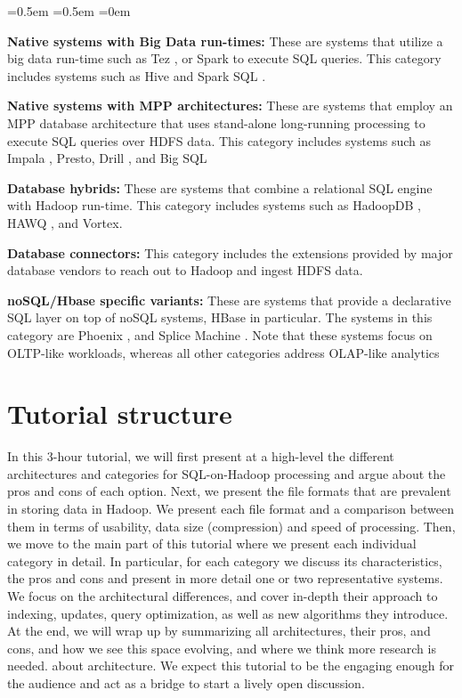 \documentclass{vldb}
\newcounter{mycounter}
\begin{document}
\vspace{-2mm}
\setcounter{mycounter}{0}
\begin{list}{.}{\leftmargin=1.4em}
  \itemsep=0.5em
  \parsep=0.5em
  \parskip=0em
\item {{\bf Native systems with Big Data run-times:} These are systems that utilize a big data run-time such as Tez \cite{tezsigmod15}, or Spark \cite{sparkhotcloud10} to execute SQL queries. This category includes systems such as Hive \cite{hive} and Spark SQL \cite{sparkSQL}.}
\item{ {\bf Native systems with MPP architectures:} These are systems that employ an MPP database architecture that uses stand-alone long-running processing to execute SQL queries over HDFS data. This category includes systems such as Impala \cite{Kornacker+15}, Presto, Drill \cite{drill}, and Big SQL \cite{bigsql}}
\item{{\bf Database hybrids:} These are systems that combine a relational SQL engine with Hadoop run-time. This category includes systems such as HadoopDB \cite{hadoopdb}, HAWQ \cite{hawq}, and Vortex.}
\item{ {\bf Database connectors:} This category includes the extensions provided by major database vendors to reach out to Hadoop and ingest HDFS data.}
\item{ {\bf noSQL/Hbase specific variants:} These are systems that provide a declarative SQL layer on top of noSQL systems, HBase in particular. The systems in this category are Phoenix \cite{phoenix}, and Splice Machine \cite{splice}. Note that these systems focus on OLTP-like workloads, whereas all other categories address OLAP-like analytics}
\end{list}

\section{Tutorial structure}

In this 3-hour tutorial, we will first present at a high-level the different architectures and categories for SQL-on-Hadoop processing and argue about the pros and cons of each option.
Next, we present the file formats that are prevalent in storing data in Hadoop. We present each file format and a comparison between them in terms of usability, data size (compression) and speed of processing. Then, we move to the main part of this tutorial where we present each individual category in detail. In particular, for each category we discuss its characteristics, the pros and cons and present in more detail one or two representative systems.
We focus on the architectural differences, and cover in-depth their approach to indexing, updates, query optimization, as well as new algorithms they introduce.
At the end, we will wrap up by summarizing all architectures, their pros, and cons, and how we see this space evolving, and where we think more research is needed.
about architecture. 
We expect this tutorial to be the engaging enough for the audience and act as a bridge to start a lively open discussion.  
\end{document}
